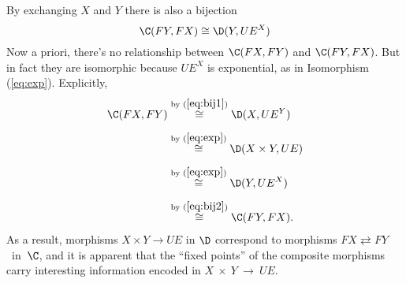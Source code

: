 By exchanging $X$ and $Y$ there is also a bijection
\begin{equation}\label{eq:bij2}
\C(FY,FX)\cong \D(Y,UE^X)
\end{equation}
Now a priori, there's no relationship between $\C(FX,FY)$ and $\C(FY,FX)$.  But in fact they are isomorphic because $UE^X$ is exponential, as in Isomorphism (\ref{eq:exp}). Explicitly,
\begin{align*}
\C(FX,FY) &\overset{\text{by }(\ref{eq:bij1})}{\cong}  \D(X,UE^Y)\\[5pt]
 &\overset{\text{by }(\ref{eq:exp})}{\cong} \D(X\times Y,UE) \\[5pt] 
 &\overset{\text{by }(\ref{eq:exp})}{\cong} \D(Y,UE^X) \\[5pt]
 &\overset{\text{by } (\ref{eq:bij2})}{\cong} \C(FY,FX).
\end{align*}
As a result, morphisms $X\times Y\to UE$ in $\D$ correspond to morphisms $FX\rightleftarrows FY$~in~$\C$, and it is apparent that the ``fixed points'' of the composite morphisms carry interesting information encoded in  $X~\times~Y~\to~UE$.

